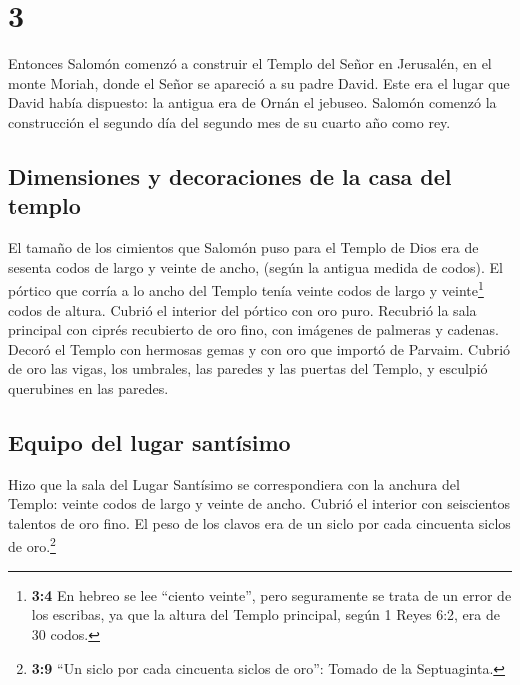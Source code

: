 \hypertarget{section-2}{%
\section{3}\label{section-2}}

 Entonces Salomón comenzó a construir el Templo del Señor
en Jerusalén, en el monte Moriah, donde el Señor se apareció a su padre
David. Este era el lugar que David había dispuesto: la antigua era de
Ornán el jebuseo.  Salomón comenzó la construcción el
segundo día del segundo mes de su cuarto año como rey.

\hypertarget{dimensiones-y-decoraciones-de-la-casa-del-templo}{%
\subsection{Dimensiones y decoraciones de la casa del
templo}\label{dimensiones-y-decoraciones-de-la-casa-del-templo}}

 El tamaño de los cimientos que Salomón puso para el
Templo de Dios era de sesenta codos de largo y veinte de ancho, (según
la antigua medida de codos).  El pórtico que corría a lo
ancho del Templo tenía veinte codos de largo y veinte\footnote{\textbf{3:4}
  En hebreo se lee ``ciento veinte'', pero seguramente se trata de un
  error de los escribas, ya que la altura del Templo principal, según 1
  Reyes 6:2, era de 30 codos.} codos de altura. Cubrió el interior del
pórtico con oro puro.  Recubrió la sala principal con
ciprés recubierto de oro fino, con imágenes de palmeras y cadenas.
 Decoró el Templo con hermosas gemas y con oro que importó
de Parvaim.  Cubrió de oro las vigas, los umbrales, las
paredes y las puertas del Templo, y esculpió querubines en las paredes.

\hypertarget{equipo-del-lugar-santuxedsimo}{%
\subsection{Equipo del lugar
santísimo}\label{equipo-del-lugar-santuxedsimo}}

 Hizo que la sala del Lugar Santísimo se correspondiera
con la anchura del Templo: veinte codos de largo y veinte de ancho.
Cubrió el interior con seiscientos talentos de oro fino. 
El peso de los clavos era de un siclo por cada cincuenta siclos de
oro.\footnote{\textbf{3:9} ``Un siclo por cada cincuenta siclos de
  oro'': Tomado de la Septuaginta.}


